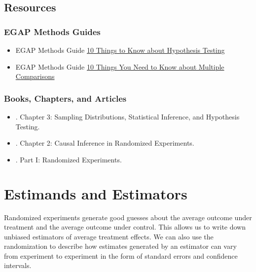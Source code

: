 \documentclass[12pt,]{book}
\begin{document}
\hypertarget{resources-3}{%
\section{Resources}\label{resources-3}}

\hypertarget{egap-methods-guides-3}{%
\subsection{EGAP Methods Guides}\label{egap-methods-guides-3}}

\begin{itemize}
\item
  EGAP Methods Guide \href{https://egap.org/resource/10-things-to-know-about-hypothesis-testing/}{10 Things to Know about Hypothesis Testing}
\item
  EGAP Methods Guide \href{https://egap.org/resource/10-things-to-know-about-multiple-comparisons/}{10 Things You Need to Know about Multiple Comparisons}
\end{itemize}

\hypertarget{books-chapters-and-articles-2}{%
\subsection{Books, Chapters, and Articles}\label{books-chapters-and-articles-2}}

\begin{itemize}
\item
  \autocite{gerber_field_2012}. Chapter 3: Sampling Distributions, Statistical Inference, and Hypothesis Testing.
\item
  \autocite{rosenbaum2010design}. Chapter 2: Causal Inference in Randomized Experiments.
\item
  \autocite{rosenbaum2017observation}. Part I: Randomized Experiments.
\end{itemize}

\hypertarget{estimands-and-estimators}{%
\chapter{Estimands and Estimators}\label{estimands-and-estimators}}

Randomized experiments generate good guesses about the average outcome under treatment and the average outcome under control. This allows us to write down unbiased estimators of average treatment effects. We can also use the randomization to describe how estimates generated by an estimator can vary from experiment to experiment in the form of standard errors and confidence intervals.
\end{document}

